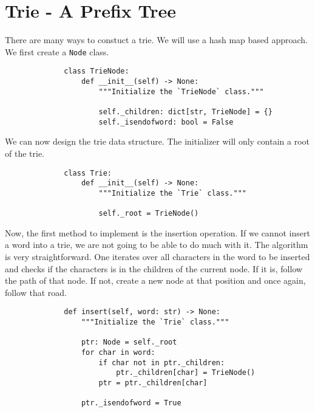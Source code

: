 
\section{Trie - A Prefix Tree}

There are many ways to constuct a trie. We will use a hash map based approach.
We first create a \texttt{Node} class.

\begin{figure}[H]
    \centering
    \begin{verbatim}
        class TrieNode:
            def __init__(self) -> None:
                """Initialize the `TrieNode` class."""

                self._children: dict[str, TrieNode] = {}
                self._isendofword: bool = False
    \end{verbatim}
\end{figure}

We can now design the trie data structure. The initializer will only contain a
root of the trie.

\begin{figure}[H]
    \centering
    \begin{verbatim}
        class Trie:
            def __init__(self) -> None:
                """Initialize the `Trie` class."""

                self._root = TrieNode()
    \end{verbatim}
\end{figure}

Now, the first method to implement is the insertion operation. If we cannot
insert a word into a trie, we are not going to be able to do much with it. The
algorithm is very straightforward. One iterates over all characters in the word
to be inserted and checks if the characters is in the children of the current
node. If it is, follow the path of that node. If not, create a new node at that
position and once again, follow that road.

\begin{figure}[H]
    \centering
    \begin{verbatim}
        def insert(self, word: str) -> None:
            """Initialize the `Trie` class."""

            ptr: Node = self._root
            for char in word:
                if char not in ptr._children:
                    ptr._children[char] = TrieNode()
                ptr = ptr._children[char]

            ptr._isendofword = True
    \end{verbatim}
\end{figure}

